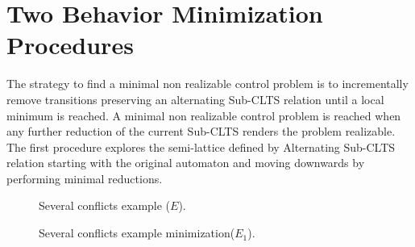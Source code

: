 \section{Two Behavior Minimization Procedures}\label{sect:solution}

The strategy to find a minimal non realizable control problem is to incrementally remove transitions preserving an alternating Sub-CLTS relation until a local minimum is reached.  A minimal non realizable control problem is reached when any further reduction of the current Sub-CLTS renders the problem realizable.
The first procedure explores the semi-lattice defined by Alternating Sub-CLTS relation starting with the original automaton and moving downwards by performing minimal reductions. 
  
\begin{figure}[bt]
\centering
\SmallPicture
{}
\caption{Several conflicts example ($E$).}
\label{fig:fig.several-conflicts}
\MediumPicture
\end{figure}

\begin{figure}[bt]
\centering
\SmallPicture
{}
\caption{Several conflicts example minimization($E_1$).}
\label{fig:fig.several-conflicts-min1}
\MediumPicture
\end{figure}

